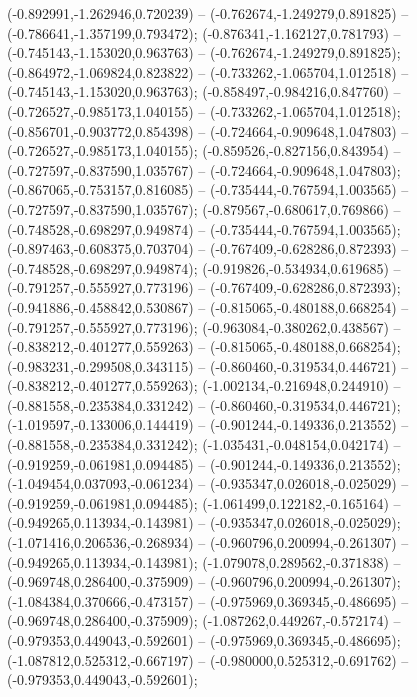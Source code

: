  (-0.892991,-1.262946,0.720239) -- (-0.762674,-1.249279,0.891825) -- (-0.786641,-1.357199,0.793472);
 (-0.876341,-1.162127,0.781793) -- (-0.745143,-1.153020,0.963763) -- (-0.762674,-1.249279,0.891825);
 (-0.864972,-1.069824,0.823822) -- (-0.733262,-1.065704,1.012518) -- (-0.745143,-1.153020,0.963763);
 (-0.858497,-0.984216,0.847760) -- (-0.726527,-0.985173,1.040155) -- (-0.733262,-1.065704,1.012518);
 (-0.856701,-0.903772,0.854398) -- (-0.724664,-0.909648,1.047803) -- (-0.726527,-0.985173,1.040155);
 (-0.859526,-0.827156,0.843954) -- (-0.727597,-0.837590,1.035767) -- (-0.724664,-0.909648,1.047803);
 (-0.867065,-0.753157,0.816085) -- (-0.735444,-0.767594,1.003565) -- (-0.727597,-0.837590,1.035767);
 (-0.879567,-0.680617,0.769866) -- (-0.748528,-0.698297,0.949874) -- (-0.735444,-0.767594,1.003565);
 (-0.897463,-0.608375,0.703704) -- (-0.767409,-0.628286,0.872393) -- (-0.748528,-0.698297,0.949874);
 (-0.919826,-0.534934,0.619685) -- (-0.791257,-0.555927,0.773196) -- (-0.767409,-0.628286,0.872393);
 (-0.941886,-0.458842,0.530867) -- (-0.815065,-0.480188,0.668254) -- (-0.791257,-0.555927,0.773196);
 (-0.963084,-0.380262,0.438567) -- (-0.838212,-0.401277,0.559263) -- (-0.815065,-0.480188,0.668254);
 (-0.983231,-0.299508,0.343115) -- (-0.860460,-0.319534,0.446721) -- (-0.838212,-0.401277,0.559263);
 (-1.002134,-0.216948,0.244910) -- (-0.881558,-0.235384,0.331242) -- (-0.860460,-0.319534,0.446721);
 (-1.019597,-0.133006,0.144419) -- (-0.901244,-0.149336,0.213552) -- (-0.881558,-0.235384,0.331242);
 (-1.035431,-0.048154,0.042174) -- (-0.919259,-0.061981,0.094485) -- (-0.901244,-0.149336,0.213552);
 (-1.049454,0.037093,-0.061234) -- (-0.935347,0.026018,-0.025029) -- (-0.919259,-0.061981,0.094485);
 (-1.061499,0.122182,-0.165164) -- (-0.949265,0.113934,-0.143981) -- (-0.935347,0.026018,-0.025029);
 (-1.071416,0.206536,-0.268934) -- (-0.960796,0.200994,-0.261307) -- (-0.949265,0.113934,-0.143981);
 (-1.079078,0.289562,-0.371838) -- (-0.969748,0.286400,-0.375909) -- (-0.960796,0.200994,-0.261307);
 (-1.084384,0.370666,-0.473157) -- (-0.975969,0.369345,-0.486695) -- (-0.969748,0.286400,-0.375909);
 (-1.087262,0.449267,-0.572174) -- (-0.979353,0.449043,-0.592601) -- (-0.975969,0.369345,-0.486695);
 (-1.087812,0.525312,-0.667197) -- (-0.980000,0.525312,-0.691762) -- (-0.979353,0.449043,-0.592601);
